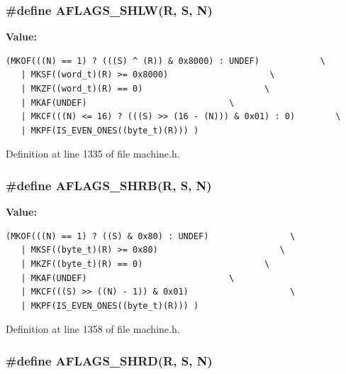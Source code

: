 \subsubsection[{AFLAGS\_\-SHLW}]{\setlength{\rightskip}{0pt plus 5cm}\#define AFLAGS\_\-SHLW(R, \/  S, \/  N)}\label{machine_8h_2d6f745fa217505a2a4d8c3bb538b61c}


\textbf{Value:}

\begin{Code}\begin{verbatim}(MKOF(((N) == 1) ? (((S) ^ (R)) & 0x8000) : UNDEF)            \
   | MKSF((word_t)(R) >= 0x8000)                    \
   | MKZF((word_t)(R) == 0)                        \
   | MKAF(UNDEF)                            \
   | MKCF(((N) <= 16) ? (((S) >> (16 - (N))) & 0x01) : 0)        \
   | MKPF(IS_EVEN_ONES((byte_t)(R))) )
\end{verbatim}
\end{Code}


Definition at line 1335 of file machine.h.
\subsubsection[{AFLAGS\_\-SHRB}]{\setlength{\rightskip}{0pt plus 5cm}\#define AFLAGS\_\-SHRB(R, \/  S, \/  N)}\label{machine_8h_d2794d4c313c056432d259fce3a8aebc}


\textbf{Value:}

\begin{Code}\begin{verbatim}(MKOF(((N) == 1) ? ((S) & 0x80) : UNDEF)                \
   | MKSF((byte_t)(R) >= 0x80)                        \
   | MKZF((byte_t)(R) == 0)                        \
   | MKAF(UNDEF)                            \
   | MKCF(((S) >> ((N) - 1)) & 0x01)                    \
   | MKPF(IS_EVEN_ONES((byte_t)(R))) )
\end{verbatim}
\end{Code}


Definition at line 1358 of file machine.h.
\subsubsection[{AFLAGS\_\-SHRD}]{\setlength{\rightskip}{0pt plus 5cm}\#define AFLAGS\_\-SHRD(R, \/  S, \/  N)}\label{machine_8h_c464276095d2f8faaa4bea1da299f5e0}


